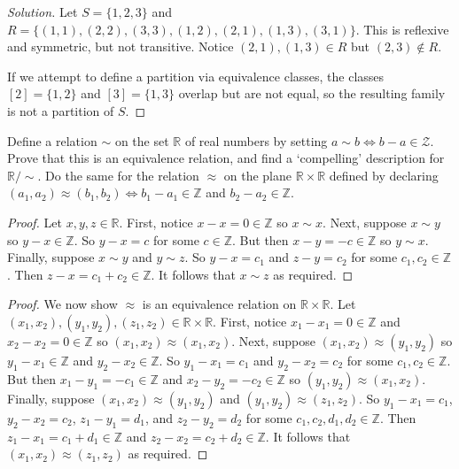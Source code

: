 \begin{proof}[Solution]
    Let $S = \{1, 2, 3\}$ and $R = \{(1,1),(2,2),(3,3),(1,2),(2,1),(1,3),(3,1)\}$.
    This is reflexive and symmetric, but not transitive. Notice $(2,1),(1,3) \in R$ but $(2,3) \notin R$.

    If we attempt to define a partition via equivalence classes, 
    the classes $[2] = \{1,2\}$ and $[3] = \{1,3\}$ overlap but are not equal,
    so the resulting family is not a partition of $S$.
\end{proof}


\begin{tcolorbox}[title=Problem 6, breakable]   
    Define a relation $\sim$ on the set $\mathbb{R}$ of real numbers by setting $a \sim b
        \iff b - a \in \mathcal{Z}$. 
    Prove that this is an equivalence relation, and find a `compelling' description 
        for $\mathbb{R}/\sim$. Do the same for the relation $\approx$ on the plane $\mathbb{R} \times \mathbb{R}$
        defined by declaring $(a_1, a_2) \approx (b_1, b_2) \iff b_1 - a_1 \in \mathbb{Z}$ and $b_2 - a_2 \in \mathbb{Z}$.
\end{tcolorbox}

\begin{proof}
    Let $x, y, z \in \mathbb{R}$.
    First, notice $x - x = 0 \in \mathbb{Z}$ so $x \sim x$.
    Next, suppose $x \sim y$ so $y - x \in \mathbb{Z}$.
    So $y - x = c$ for some $c \in \mathbb{Z}$.
    But then $x - y = -c \in \mathbb{Z}$ so $y \sim x$.
    Finally, suppose $x \sim y$ and $y \sim z$.
    So $y - x = c_1$ and $z - y = c_2$ for some $c_1, c_2 \in \mathbb{Z}$.
    Then $z - x = c_1 + c_2 \in \mathbb{Z}$.
    It follows that $x \sim z$ as required.
\end{proof}

\begin{proof}
    We now show $\approx$ is an equivalence relation on $\mathbb{R} \times \mathbb{R}$.
    Let $(x_1, x_2), (y_1, y_2), (z_1, z_2) \in \mathbb{R} \times \mathbb{R}$.
    First, notice $x_1 - x_1 = 0 \in \mathbb{Z}$ and $x_2 - x_2 = 0 \in \mathbb{Z}$ so $(x_1, x_2) \approx (x_1, x_2)$.
    Next, suppose $(x_1, x_2) \approx (y_1, y_2)$ so $y_1 - x_1 \in \mathbb{Z}$ and $y_2 - x_2 \in \mathbb{Z}$.
    So $y_1 - x_1 = c_1$ and $y_2 - x_2 = c_2$ for some $c_1, c_2 \in \mathbb{Z}$.
    But then $x_1 - y_1 = -c_1 \in \mathbb{Z}$ and $x_2 - y_2 = -c_2 \in \mathbb{Z}$ so $(y_1, y_2) \approx (x_1, x_2)$.
    Finally, suppose $(x_1, x_2) \approx (y_1, y_2)$ and $(y_1, y_2) \approx (z_1, z_2)$.
    So $y_1 - x_1 = c_1$, $y_2 - x_2 = c_2$, $z_1 - y_1 = d_1$, and $z_2 - y_2 = d_2$ for some $c_1, c_2, d_1, d_2 \in \mathbb{Z}$.
    Then $z_1 - x_1 = c_1 + d_1 \in \mathbb{Z}$ and $z_2 - x_2 = c_2 + d_2 \in \mathbb{Z}$.
    It follows that $(x_1, x_2) \approx (z_1, z_2)$ as required.
\end{proof}

